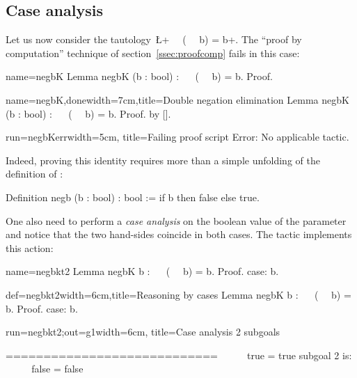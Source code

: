 \subsection{Case analysis}\label{ssec:case}
Let us now consider the tautology~\L+~~ (~~ b) = b+. The
``proof by computation'' technique of section~\ref{ssec:proofcomp}
fails in this case:

\begin{coqdef}{name=negbK}
Lemma negbK (b : bool) : ~~ (~~ b) = b.
Proof.
\end{coqdef}
\begin{coq}{name=negbK,done}{width=7cm,title=Double negation elimination}
Lemma negbK (b : bool) : ~~ (~~ b) = b.
Proof. by [].
\end{coq}
\begin{coqout}{run=negbKerr}{width=5cm, title=Failing proof script}
Error: No applicable
tactic.
\end{coqout}

Indeed, proving this identity requires more than a simple unfolding of
the definition of :

\begin{coq}{}{}
Definition negb (b : bool) : bool := if b then false else true.
\end{coq}
One also need to perform a \emph{case analysis} on the boolean value
of the parameter  and notice that the two hand-sides coincide in
both cases. The tactic  implements this action:

\begin{coqdef}{name=negbkt2}
Lemma negbK b : ~~ (~~ b) = b.
Proof.
case: b.
\end{coqdef}
\begin{coq}{def=negbkt2}{width=6cm,title=Reasoning by cases}
Lemma negbK b : ~~ (~~ b) = b.
Proof.
case: b.
$~$
$~$
$~$
\end{coq}
\begin{coqout}{run=negbkt2;out=g1}{width=6cm, title=Case analysis}
2 subgoals

  ============================
   ~~ ~~ true = true
subgoal 2 is:
 ~~ ~~ false = false
\end{coqout}

